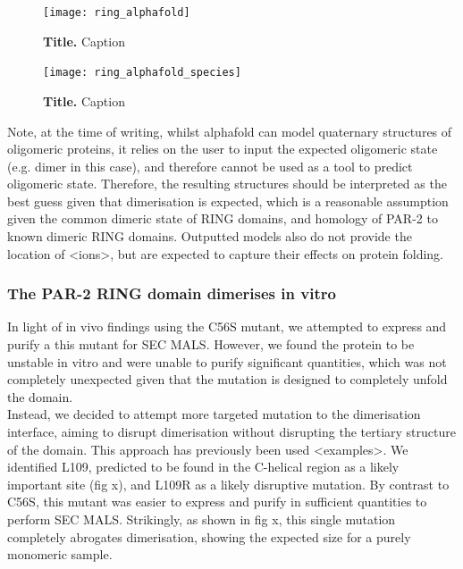 \documentclass[12pt]{"article"}
\newcommand{\mycaption}[2]{\caption[#1]{\textbf{#1.} #2}}
\begin{document}
\begin{figure}[!h]
\texttt{[image: ring\_alphafold]}
\setlength{\abovecaptionskip}{20pt}
\centering
\mycaption{Title}{Caption}
\label{fig:ring_alphafold}
\end{figure}

\begin{figure}[!h]
\texttt{[image: ring\_alphafold\_species]}
\setlength{\abovecaptionskip}{20pt}
\centering
\mycaption{Title}{Caption}
\label{fig:ring_alphafold_species}
\end{figure}

Note, at the time of writing, whilst alphafold can model quaternary structures of oligomeric proteins, it relies on the user to input the expected oligomeric state (e.g. dimer in this case), and therefore cannot be used as a tool to predict oligomeric state. Therefore, the resulting structures should be interpreted as the best guess given that dimerisation is expected, which is a reasonable assumption given the common dimeric state of RING domains, and homology of PAR-2 to known dimeric RING domains. Outputted models also do not provide the location of <ions>, but are expected to capture their effects on protein folding.


\clearpage
\subsubsection{The PAR-2 RING domain dimerises in vitro}


In light of in vivo findings using the C56S mutant, we attempted to express and purify a this mutant for SEC MALS. However, we found the protein to be unstable in vitro and were unable to purify significant quantities, which was not completely unexpected given that the mutation is designed to completely unfold the domain.\\

Instead, we decided to attempt more targeted mutation to the dimerisation interface, aiming to disrupt dimerisation without disrupting the tertiary structure of the domain. This approach has previously been used <examples>. We identified L109, predicted to be found in the C-helical region as a likely important site (fig x), and L109R as a likely disruptive mutation. By contrast to C56S, this mutant was easier to express and purify in sufficient quantities to perform SEC MALS. Strikingly, as shown in fig x, this single mutation completely abrogates dimerisation, showing the expected size for a purely monomeric sample.\\
\end{document}
